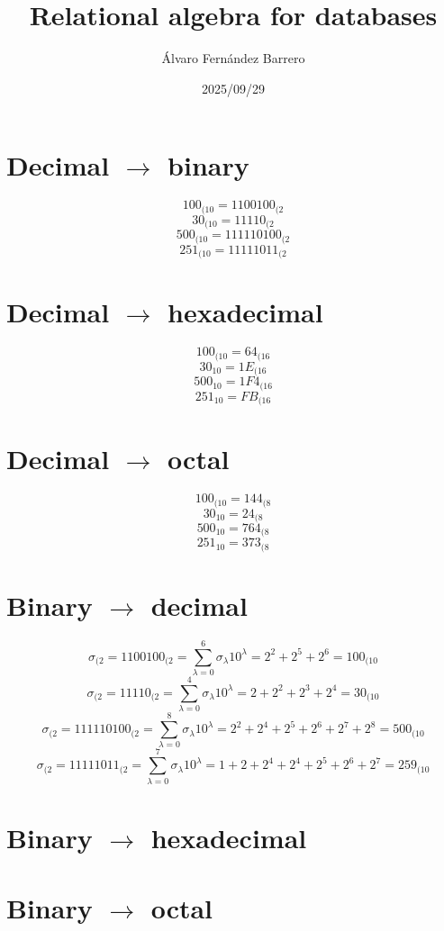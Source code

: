\documentclass[12pt]{article}
\title{Relational algebra for databases}
\author{Álvaro Fernández Barrero}
\date{2025/09/29}
\begin{document}
\maketitle

\section{Decimal \(\to\) binary}

\[
	100_{(10} = 1100100_{(2}
\]
\[
	30_{(10} = 11110_{(2}
\]
\[
	500_{(10} = 111110100_{(2}
\]
\[
	251_{(10} = 11111011_{(2}
\]

\section{Decimal \(\to\) hexadecimal}

\[
	100_{(10} = 64_{(16}
\]
\[
	30_{10} = 1E_{(16}
\]
\[
	500_{10} = 1F4_{(16}
\]
\[
	251_{10} = FB_{(16}
\]

\section{Decimal \(\to\) octal}

\[
	100_{(10} = 144_{(8}
\]
\[
	30_{10} = 24_{(8}
\]
\[
	500_{10} = 764_{(8}
\]
\[
	251_{10} = 373_{(8}
\]

\section{Binary \(\to\) decimal}

\[
	\sigma_{(2} = 1100100_{(2} = \sum_{\lambda=0}^{6}\sigma_{\lambda}10^{\lambda} = 2^2 + 2^5 + 2^6 = 100_{(10}
\]
\[
	\sigma_{(2} = 11110_{(2} = \sum_{\lambda=0}^{4}\sigma_{\lambda}10^{\lambda} = 2 + 2^2 + 2^3 + 2^4 = 30_{(10}
\]
\[
	\sigma_{(2} = 111110100_{(2} = \sum_{\lambda=0}^{8}\sigma_{\lambda}10^{\lambda} = 2^2 + 2^4 + 2^5 + 2^6 + 2^7 + 2^8 = 500_{(10}
\]
\[
	\sigma_{(2} = 11111011_{(2} = \sum_{\lambda=0}^{7}\sigma_{\lambda}10^{\lambda} = 1 + 2 + 2^4 + 2^4 + 2^5 + 2^6 + 2^7 = 259_{(10}
\]

\section{Binary \(\to\) hexadecimal}

\section{Binary \(\to\) octal}
\end{document}
